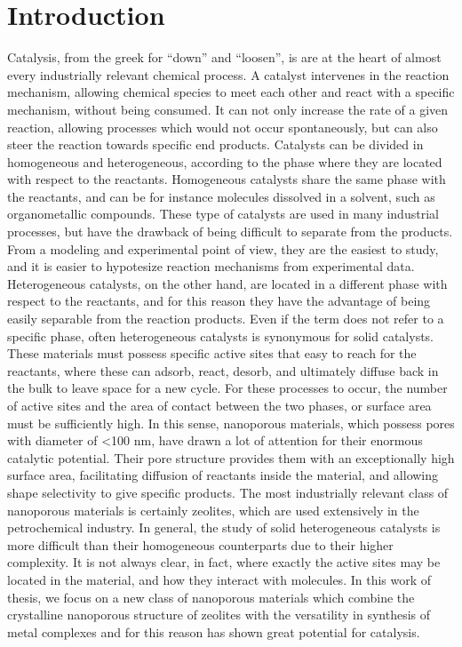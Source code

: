 \graphicspath{{figures/}}

\renewcommand\evenpagerightmark{{\scshape\small Introduction}}
\renewcommand\oddpageleftmark{{\scshape\small Chapter 1}}


\hyphenation{}

\chapter[Introduction]%
{Introduction}
\label{ch1}

Catalysis, from the greek for ``down'' and ``loosen'', is are at the heart of almost every industrially relevant chemical process. A catalyst intervenes in the reaction mechanism, allowing chemical species to meet each other and react with a specific mechanism, without being consumed. It can not only increase the rate of a given reaction, allowing processes which would not occur spontaneously, but can also steer the reaction towards specific end products. Catalysts can be divided in homogeneous and heterogeneous, according to the phase where they are located with respect to the reactants. Homogeneous catalysts share the same phase with the reactants, and can be for instance molecules dissolved in a solvent, such as organometallic compounds. These type of catalysts are used in many industrial processes,  but have the drawback of being difficult to separate from the products. From a modeling and experimental point of view, they are the easiest to study, and it is easier to hypotesize reaction mechanisms from experimental data. Heterogeneous catalysts, on the other hand, are located in a different phase with respect to the reactants, and for this reason they have the advantage of being easily separable from the reaction products. Even if the term does not refer to a specific phase, often heterogeneous catalysts is synonymous for solid catalysts. These materials must possess specific active sites that easy to reach for the reactants, where these can adsorb, react, desorb, and ultimately diffuse back in the bulk to leave space for a new cycle. For these processes to occur, the number of active sites and the area of contact between the two phases, or surface area must be sufficiently high. In this sense, nanoporous materials, which possess pores with diameter of <100 nm, have drawn a lot of attention for their enormous catalytic potential. Their pore structure provides them with an exceptionally high surface area, facilitating diffusion of reactants inside the material, and allowing shape selectivity to give specific products. The most industrially relevant class of nanoporous materials is certainly zeolites, which are used extensively in the petrochemical industry. In general, the study of solid heterogeneous catalysts is more difficult than their homogeneous counterparts due to their higher complexity. It is not always clear, in fact, where exactly the active sites may be located in the material, and how they interact with molecules. In this work of thesis, we focus on a new class of nanoporous materials which combine the crystalline nanoporous structure of zeolites with the versatility in synthesis of metal complexes and for this reason has shown great potential for catalysis.

